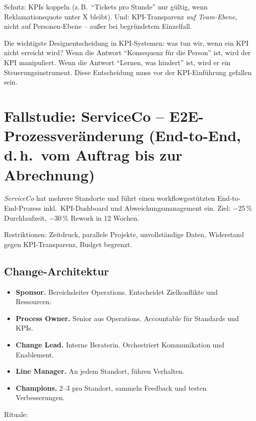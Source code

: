 \documentclass[11pt,a4paper,oneside]{article}
\begin{document}
Schutz: KPIs koppeln (z.\,B.\ ``Tickets pro Stunde'' nur gültig, wenn Reklamationsquote unter X bleibt). Und: KPI-Transparenz \emph{auf Team-Ebene}, nicht auf Personen-Ebene -- außer bei begründetem Einzelfall.

\begin{merkbox}
Die wichtigste Designentscheidung in KPI-Systemen: was tun wir, wenn ein KPI nicht erreicht wird? Wenn die Antwort ``Konsequenz für die Person'' ist, wird der KPI manipuliert. Wenn die Antwort ``Lernen, was hindert'' ist, wird er ein Steuerungsinstrument. Diese Entscheidung muss vor der KPI-Einführung gefallen sein.
\end{merkbox}

\section{Fallstudie: ServiceCo -- E2E-Prozessveränderung (End-to-End, d.\,h.\ vom Auftrag bis zur Abrechnung)}

\emph{ServiceCo} hat mehrere Standorte und führt einen workflowgestützten End-to-End-Prozess inkl.\ KPI-Dashboard und Abweichungsmanagement ein. Ziel: $-$25\,\% Durchlaufzeit, $-$30\,\% Rework in 12 Wochen.

Restriktionen: Zeitdruck, parallele Projekte, unvollständige Daten, Widerstand gegen KPI-Transparenz, Budget begrenzt.

\subsection{Change-Architektur}

\begin{itemize}
  \item \textbf{Sponsor.} Bereichsleiter Operations. Entscheidet Zielkonflikte und Ressourcen.
  \item \textbf{Process Owner.} Senior aus Operations. Accountable für Standards und KPIs.
  \item \textbf{Change Lead.} Interne Beraterin. Orchestriert Kommunikation und Enablement.
  \item \textbf{Line Manager.} An jedem Standort, führen Verhalten.
  \item \textbf{Champions.} 2--3 pro Standort, sammeln Feedback und testen Verbesserungen.
\end{itemize}

Rituale:
\end{document}

